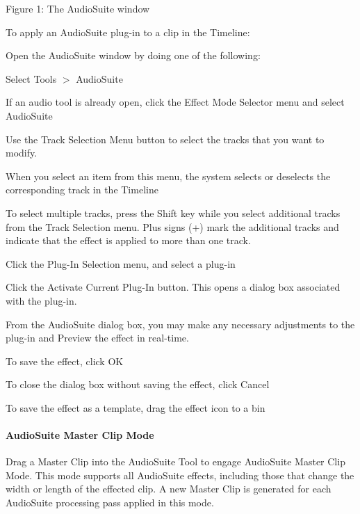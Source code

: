   Figure 1\+: The Audio\+Suite window

To apply an Audio\+Suite plug-\/in to a clip in the Timeline\+: 
\begin{DoxyEnumerate}
\item Open the Audio\+Suite window by doing one of the following\+: 
\begin{DoxyItemize}
\item Select Tools $>$ Audio\+Suite  
\item If an audio tool is already open, click the Effect Mode Selector menu and select Audio\+Suite  
\end{DoxyItemize}
\item Use the Track Selection Menu button to select the tracks that you want to modify. 
\begin{DoxyItemize}
\item When you select an item from this menu, the system selects or deselects the corresponding track in the Timeline  
\item To select multiple tracks, press the Shift key while you select additional tracks from the Track Selection menu. Plus signs (+) mark the additional tracks and indicate that the effect is applied to more than one track.  
\end{DoxyItemize}
\item Click the Plug-\/\+In Selection menu, and select a plug-\/in  
\item Click the Activate Current Plug-\/\+In button. This opens a dialog box associated with the plug-\/in.  
\end{DoxyEnumerate}

From the Audio\+Suite dialog box, you may make any necessary adjustments to the plug-\/in and Preview the effect in real-\/time. 
\begin{DoxyItemize}
\item To save the effect, click OK  
\item To close the dialog box without saving the effect, click Cancel  
\item To save the effect as a template, drag the effect icon to a bin  
\end{DoxyItemize}

\hypertarget{a00831_subsubsection__media_composer_guide__audiosuite_master_clip_mode}{}\paragraph{Audio\+Suite Master Clip Mode}\label{a00831_subsubsection__media_composer_guide__audiosuite_master_clip_mode}
 Drag a Master Clip into the Audio\+Suite Tool to engage Audio\+Suite Master Clip Mode. This mode supports all Audio\+Suite effects, including those that change the width or length of the effected clip. A new Master Clip is generated for each Audio\+Suite processing pass applied in this mode.

